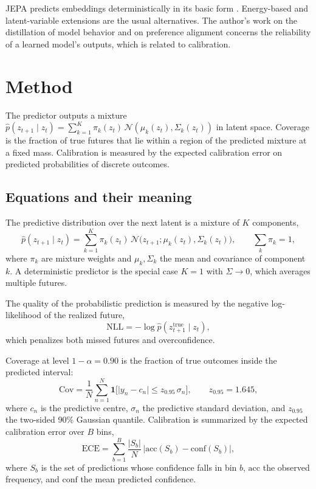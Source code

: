 \documentclass[conference]{IEEEtran}
\begin{document}
JEPA predicts embeddings deterministically in its basic form \cite{bardes2024vjepa}. Energy-based and latent-variable extensions are the usual alternatives. The author's work on the distillation of model behavior \cite{d8distillation} and on preference alignment \cite{d7rlaif} concerns the reliability of a learned model's outputs, which is related to calibration.

\section{Method}
The predictor outputs a mixture $\hat{p}(z_{t+1} \mid z_t) = \sum_{k=1}^{K} \pi_k(z_t)\, \mathcal{N}(\mu_k(z_t), \Sigma_k(z_t))$ in latent space. Coverage is the fraction of true futures that lie within a region of the predicted mixture at a fixed mass. Calibration is measured by the expected calibration error on predicted probabilities of discrete outcomes.

\subsection*{Equations and their meaning}
The predictive distribution over the next latent is a mixture of $K$ components,
\begin{equation}
\hat p(z_{t+1}\mid z_t)=\sum_{k=1}^{K}\pi_k(z_t)\,\mathcal{N}\big(z_{t+1};\mu_k(z_t),\Sigma_k(z_t)\big),\qquad \sum_k\pi_k=1,
\end{equation}
where $\pi_k$ are mixture weights and $\mu_k,\Sigma_k$ the mean and covariance of component $k$. A deterministic predictor is the special case $K=1$ with $\Sigma\to 0$, which averages multiple futures.

The quality of the probabilistic prediction is measured by the negative log-likelihood of the realized future,
\begin{equation}
\mathrm{NLL}=-\log\hat p(z_{t+1}^{\mathrm{true}}\mid z_t),
\end{equation}
which penalizes both missed futures and overconfidence.

Coverage at level $1-\alpha=0.90$ is the fraction of true outcomes inside the predicted interval:
\begin{equation}
\mathrm{Cov}=\frac{1}{N}\sum_{n=1}^{N}\mathbf{1}\big[\lvert y_n-c_n\rvert\le z_{0.95}\,\sigma_n\big],\qquad z_{0.95}=1.645,
\end{equation}
where $c_n$ is the predictive centre, $\sigma_n$ the predictive standard deviation, and $z_{0.95}$ the two-sided 90\% Gaussian quantile. Calibration is summarized by the expected calibration error over $B$ bins,
\begin{equation}
\mathrm{ECE}=\sum_{b=1}^{B}\frac{\lvert S_b\rvert}{N}\,\big\lvert\mathrm{acc}(S_b)-\mathrm{conf}(S_b)\big\rvert,
\end{equation}
where $S_b$ is the set of predictions whose confidence falls in bin $b$, $\mathrm{acc}$ the observed frequency, and $\mathrm{conf}$ the mean predicted confidence.
\end{document}
